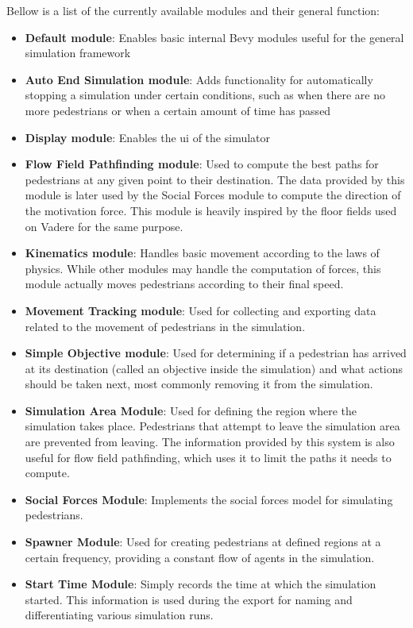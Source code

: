 \documentclass[twoside, 11pt]{article}
\begin{document}
Bellow is a list of the currently available modules and their general function:

\begin{itemize}
  \item \textbf{Default module}: Enables basic internal Bevy modules useful for the general simulation framework
  \item \textbf{Auto End Simulation module}: Adds functionality for automatically stopping a simulation under certain conditions, such as when there are no more pedestrians or when a certain amount of time has passed
  \item \textbf{Display module}: Enables the \gls{ui} of the simulator
  \item \textbf{Flow Field Pathfinding module}: Used to compute the best paths for pedestrians at any given point to their destination. The data provided by this module is later used by the Social Forces module to compute the direction of the motivation force. This module is heavily inspired by the floor fields used on Vadere for the same purpose.
  \item \textbf{Kinematics module}: Handles basic movement according to the laws of physics. While other modules may handle the computation of forces, this module actually moves pedestrians according to their final speed.
  \item \textbf{Movement Tracking module}: Used for collecting and exporting data related to the movement of pedestrians in the simulation.
  \item \textbf{Simple Objective module}: Used for determining if a pedestrian has arrived at its destination (called an objective inside the simulation) and what actions should be taken next, most commonly removing it from the simulation.
  \item \textbf{Simulation Area Module}: Used for defining the region where the simulation takes place. Pedestrians that attempt to leave the simulation area are prevented from leaving. The information provided by this system is also useful for flow field pathfinding, which uses it to limit the paths it needs to compute.
  \item \textbf{Social Forces Module}: Implements the social forces model for simulating pedestrians.
  \item \textbf{Spawner Module}: Used for creating pedestrians at defined regions at a certain frequency, providing a constant flow of agents in the simulation.
  \item \textbf{Start Time Module}: Simply records the time at which the simulation started. This information is used during the export for naming and differentiating various simulation runs.
\end{itemize}
\end{document}
